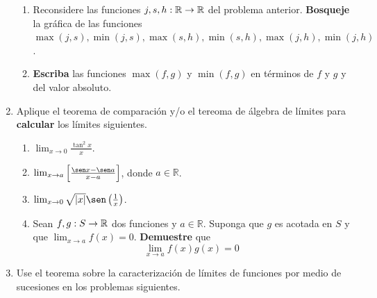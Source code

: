 \documentclass[12pt]{article}
\begin{document}
\begin{enumerate}
\begin{equation*}
    \end{equation*}
    \begin{enumerate}
        \item Reconsidere las funciones $j,s,h:\mathbb{R}\rightarrow\mathbb{R}$ del problema anterior. \textbf{Bosqueje} la gráfica de las funciones $\max(j,s),\min(j,s),\max(s,h),\min(s,h),\max(j,h),\min(j,h)$.
        \item \textbf{Escriba} las funciones $\max(f,g)$ y $\min(f,g)$ en términos de $f$ y $g$ y del valor absoluto.
    \end{enumerate}
    \item Aplique el teorema de comparación y/o el tereoma de álgebra de límites para \textbf{calcular} los límites siguientes.
    \begin{enumerate}
        \item $\lim_{x\rightarrow0}\frac{\tan^2x}{x}$.
        \item $\lim_{x\rightarrow a}\left[\frac{\sen x-\sen a}{x-a} \right]$, donde $a\in\mathbb{R}$.
        \item $\lim_{x\rightarrow0}\sqrt{\abs{x}}\sen\left(\frac{1}{x}\right)$.
        \item Sean $f,g:S\rightarrow\mathbb{R}$ dos funciones y $a\in\mathbb{R}$. Suponga que $g$ es acotada en $S$ y que $\lim_{x\rightarrow a}f(x)=0$. \textbf{Demuestre} que
        \begin{equation*}
            \lim_{x\rightarrow a}f(x)g(x)=0
        \end{equation*}
    \end{enumerate}
    \item Use el teorema sobre la caracterización de límites de funciones por medio de sucesiones en los problemas siguientes.
\end{enumerate}
\end{document}
